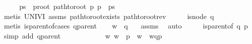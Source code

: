 \begin{isabellebody}
\ \ \isamarkupfalse%
\ \isamarkupfalse%
\ ps\ \ p{}root{\isacharcolon}{\kern0pt}\ {\isachardoublequoteopen}path{\isacharunderscore}{\kern0pt}to{\isacharunderscore}{\kern0pt}root\ p\ {\isacharparenleft}{\kern0pt}p\ {\isacharhash}{\kern0pt}\ ps{\isacharparenright}{\kern0pt}{\isachardoublequoteclose}\ \isamarkupfalse%
\ {\isacharparenleft}{\kern0pt}metis\ UNIV{\isacharunderscore}{\kern0pt}I\ assms{\isacharparenleft}{\kern0pt}{}{\isacharparenright}{\kern0pt}\ path{\isacharunderscore}{\kern0pt}to{\isacharunderscore}{\kern0pt}root{\isacharunderscore}{\kern0pt}exists\ path{\isacharunderscore}{\kern0pt}to{\isacharunderscore}{\kern0pt}root{\isacharunderscore}{\kern0pt}rev{\isacharparenright}{\kern0pt}\isanewline
\ \ \isamarkupfalse%
\ \isamarkupfalse%
\ {\isachardoublequoteopen}is{\isacharunderscore}{\kern0pt}node\ q{\isachardoublequoteclose}\ \ \isamarkupfalse%
\ {\isacharparenleft}{\kern0pt}metis\ is{\isacharunderscore}{\kern0pt}parent{\isacharunderscore}{\kern0pt}of{\isachardot}{\kern0pt}cases\ q{\isacharunderscore}{\kern0pt}parent{\isacharparenright}{\kern0pt}\isanewline
\ \ \isamarkupfalse%
\ {\isachardoublequoteopen}w\ {\isasymin}\ {\isasymL}\isactrlsup {\isacharasterisk}{\kern0pt}{\isacharparenleft}{\kern0pt}q{\isacharparenright}{\kern0pt}{\isachardoublequoteclose}\ \ \isamarkupfalse%
\ assms{\isacharparenleft}{\kern0pt}{}{\isacharparenright}{\kern0pt}\ \isamarkupfalse%
\ auto\isanewline
\ \ \isamarkupfalse%
\ \isamarkupfalse%
\ {\isachardoublequoteopen}is{\isacharunderscore}{\kern0pt}parent{\isacharunderscore}{\kern0pt}of\ q\ p{\isachardoublequoteclose}\ \isamarkupfalse%
\ {\isacharparenleft}{\kern0pt}simp\ add{\isacharcolon}{\kern0pt}\ q{\isacharunderscore}{\kern0pt}parent{\isacharparenright}{\kern0pt}\isanewline
\ \ \ \ \ \ \isanewline
\ \ \isamarkupfalse%
\ \isamarkupfalse%
\ {\isachardoublequoteopen}{\isasymexists}w{\isacharprime}{\kern0pt}{\isachardot}{\kern0pt}\ w{\isacharprime}{\kern0pt}{\isasymin}\ {\isasymL}\isactrlsup {\isacharasterisk}{\kern0pt}\ p\ {\isasymand}\ {\isacharparenleft}{\kern0pt}{\isacharparenleft}{\kern0pt}w{\isasymdown}\isactrlsub {\isacharquery}{\kern0pt}{\isacharparenright}{\kern0pt}{\isasymdown}\isactrlsub {\isacharbang}{\kern0pt}\isactrlsub {\isacharquery}{\kern0pt}{\isacharparenright}{\kern0pt}\ {\isacharequal}{\kern0pt}\ {\isacharparenleft}{\kern0pt}{\isacharparenleft}{\kern0pt}{\isacharparenleft}{\kern0pt}w{\isacharprime}{\kern0pt}{\isasymdown}\isactrlsub {\isacharbraceleft}{\kern0pt}\isactrlsub q\isactrlsub {\isacharcomma}{\kern0pt}\isactrlsub p\isactrlsub {\isacharbraceright}{\kern0pt}{\isacharparenright}{\kern0pt}{\isasymdown}\isactrlsub {\isacharbang}{\kern0pt}{\isacharparenright}{\kern0pt}{\isasymdown}\isactrlsub {\isacharbang}{\kern0pt}\isactrlsub {\isacharquery}{\kern0pt}{\isacharparenright}{\kern0pt}{\isachardoublequoteclose}\ \ \isamarkupfalse%

\end{isabellebody}
